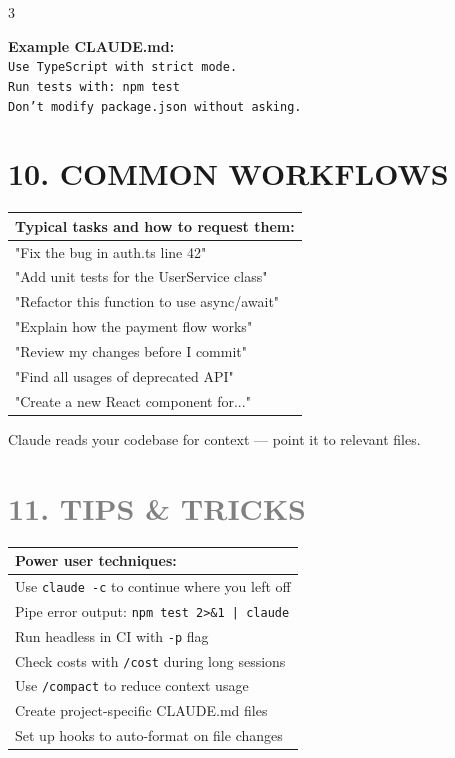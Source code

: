 \documentclass[landscape,11pt]{article}
\begin{document}
\begin{multicols}{3}
\vspace{2mm}
\begin{tcolorbox}[colback=OliveGreen!8, colframe=OliveGreen, boxsep=2pt, arc=1pt, fontupper=\small]
\textbf{Example CLAUDE.md:}\\
\texttt{Use TypeScript with strict mode.}\\
\texttt{Run tests with: npm test}\\
\texttt{Don't modify package.json without asking.}
\end{tcolorbox}

\section*{\textcolor{RawSienna}{10. COMMON WORKFLOWS}}
\renewcommand{\arraystretch}{1.15}
\begin{tabularx}{\linewidth}{@{}>{\raggedright\arraybackslash}X@{}}
\textbf{Typical tasks and how to request them:}\\
\hline
"Fix the bug in auth.ts line 42"\\
"Add unit tests for the UserService class"\\
"Refactor this function to use async/await"\\
"Explain how the payment flow works"\\
"Review my changes before I commit"\\
"Find all usages of deprecated API"\\
"Create a new React component for..."\\
\end{tabularx}
\renewcommand{\arraystretch}{1}

\vspace{2mm}
\begin{tcolorbox}[colback=RawSienna!8, colframe=RawSienna, boxsep=2pt, arc=1pt, fontupper=\small\itshape]
Claude reads your codebase for context — point it to relevant files.
\end{tcolorbox}

\section*{\textcolor{Gray}{11. TIPS \& TRICKS}}
\renewcommand{\arraystretch}{1.15}
\begin{tabularx}{\linewidth}{@{}>{\raggedright\arraybackslash}X@{}}
\textbf{Power user techniques:}\\
\hline
Use \texttt{claude -c} to continue where you left off\\
Pipe error output: \texttt{npm test 2>\&1 | claude}\\
Run headless in CI with \texttt{-p} flag\\
Check costs with \texttt{/cost} during long sessions\\
Use \texttt{/compact} to reduce context usage\\
Create project-specific CLAUDE.md files\\
Set up hooks to auto-format on file changes\\
\end{tabularx}
\renewcommand{\arraystretch}{1}

\vfill

\end{multicols}
\end{document}

